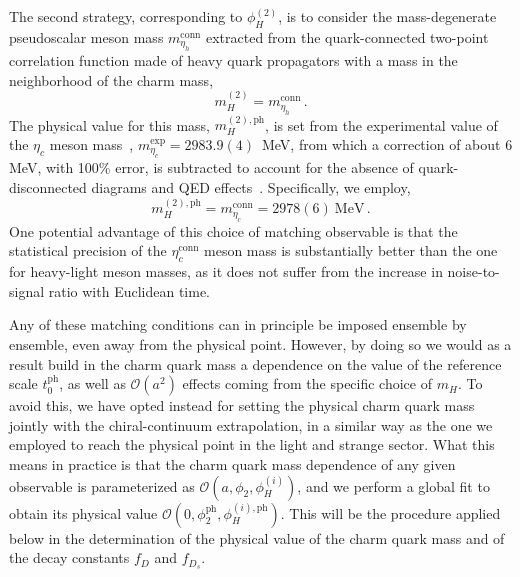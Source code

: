 The second strategy, corresponding to $\phi_H^{(2)}$, is to consider the mass-degenerate pseudoscalar meson mass $m_{\eta_h}^{\mathrm{conn}}$ extracted from the quark-connected two-point correlation function made of heavy quark propagators with a mass in the neighborhood of the charm mass,
%
\begin{equation}
  m_H^{(2)} = m_{\eta_h}^{\mathrm{conn}}\,.
\label{eq:etac_matching}
\end{equation}
%
The physical value for this mass, $m_H^{(2), \mathrm{ph}}$,  is set from the experimental value of the $\eta_c$ meson mass~\cite{ParticleDataGroup:2022pth}, $m_{\eta_c}^{\mathrm{exp}} = 2983.9(4)\,$ MeV, from which a correction of about 6 MeV, with 100\% error, is subtracted to account for the absence of quark-disconnected diagrams and QED effects~\cite{deForcrand:2004ia, Donald:2012ga,Colquhoun:2015oha,Hatton:2020qhk,Colquhoun:2023zbc}. Specifically, we employ, 
%
\begin{equation}
  m_H^{(2), \mathrm{ph}} = m_{\eta_c}^{\mathrm{conn}} = 2978(6) \ \mathrm{MeV}\,.
\end{equation}
%
One potential advantage of this choice of matching observable is that the statistical precision of the $\eta_c^{\mathrm{conn}}$ meson mass is substantially better than the one for heavy-light meson masses, as it does not suffer from the increase in noise-to-signal ratio with Euclidean time.
%

%
Any of these matching conditions can in principle be imposed ensemble by ensemble, even away from the physical point.
%
However, by doing so we would as a result build in the charm quark mass a dependence on the value of the reference scale $t_0^{\mathrm{ph}}$, as well as $\mathcal{O}(a^2)$ effects coming from the specific choice of $m_H$.
%
To avoid this, we have opted instead for setting the physical charm quark mass jointly with the chiral-continuum extrapolation, in a similar way as the one we employed to reach the physical point in the light and strange sector.
%
What this means in practice is that the charm quark mass dependence of any given observable is parameterized as $\mathcal{O}(a, \phi_2, \phi_H^{(i)})$, and we perform a global fit to obtain its physical value $\mathcal{O}(0, \phi_2^{\mathrm{ph}}, \phi_H^{(i),\mathrm{ph}})$.
%
This will be the procedure applied below in the determination of the physical value of the charm quark mass and of the decay constants $f_D$ and $f_{D_s}$.
%


